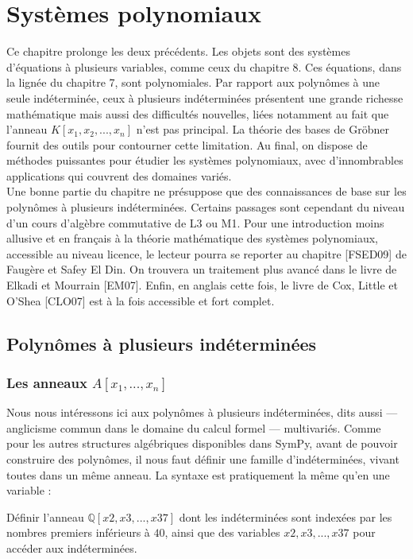 \chapter{Systèmes polynomiaux}
Ce chapitre prolonge les deux précédents. Les objets sont des systèmes d’équations à plusieurs variables, comme ceux du chapitre 8. Ces équations, dans la lignée du chapitre 7, sont polynomiales. Par rapport aux polynômes à une seule indéterminée, ceux à plusieurs indéterminées présentent une grande richesse mathématique mais aussi des difficultés nouvelles, liées notamment au fait que l’anneau $K\left[x_{1}, x_{2}, ..., x_{n}\right] $ n’est pas principal. La théorie des bases de Gröbner fournit des outils pour contourner cette limitation. Au final, on dispose de méthodes puissantes pour étudier les systèmes polynomiaux, avec d’innombrables applications
qui couvrent des domaines variés.
\\

Une bonne partie du chapitre ne présuppose que des connaissances de base sur les polynômes à plusieurs indéterminées. Certains passages sont cependant du niveau d’un cours d’algèbre commutative de L3 ou M1. Pour une introduction moins allusive et en français à la théorie mathématique des systèmes polynomiaux, accessible au niveau licence, le lecteur pourra se reporter au chapitre [FSED09] de Faugère et Safey El Din. On trouvera un traitement plus avancé dans le livre de Elkadi et Mourrain [EM07]. Enfin, en anglais cette fois, le livre de Cox, Little et O’Shea [CLO07] est à la fois accessible et fort complet.

\section{ Polynômes à plusieurs indéterminées}
 \subsection{ Les anneaux $A\left[x_{1}, ..., x_{n}\right]$}
 Nous nous intéressons ici aux polynômes à plusieurs indéterminées, dits aussi — anglicisme commun dans le domaine du calcul formel — multivariés. Comme pour les autres structures algébriques disponibles dans SymPy, avant de pouvoir construire des polynômes, il nous faut définir une famille d’indéterminées, vivant toutes dans un même anneau. La syntaxe est pratiquement la même qu’en une variable :

\begin{exercise}
Définir l’anneau $\mathbb{Q}\left[x2 , x3 , . . . , x37\right]$ dont les indéterminées sont indexées
par les nombres premiers inférieurs à $40$, ainsi que des variables $x2, x3, ..., x37$ pour
accéder aux indéterminées.
\end{exercise}

